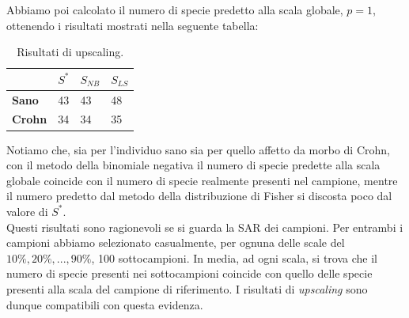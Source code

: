 Abbiamo poi calcolato il numero di specie predetto alla scala globale, $p=1$, ottenendo i risultati mostrati nella seguente tabella:

\begin{table}[H]
\centering
\begin{tabular}{l|l|l|l|}
\cline{2-4}
                                     & $S^*$ & $S_{NB}$ & $S_{LS}$ \\ \hline
\multicolumn{1}{|l|}{\textbf{Sano}}  & 43  & 43       & 48       \\ \hline
\multicolumn{1}{|l|}{\textbf{Crohn}} & 34  & 34       & 35       \\ \hline
\end{tabular}
\caption{Risultati di upscaling.}
\label{Tab:risultatiup}
\end{table}

Notiamo che, sia per l'individuo sano sia per quello affetto da morbo di Crohn, con il metodo della binomiale negativa il numero di specie predette alla scala globale coincide con il numero di specie realmente presenti nel campione, mentre il numero predetto dal metodo della distribuzione di Fisher si discosta poco dal valore di $S^*$.\\
Questi risultati sono ragionevoli se si guarda la SAR dei campioni. Per entrambi i campioni abbiamo selezionato casualmente, per ognuna delle scale del $10\%,20\%,...,90\%$, 100 sottocampioni. In media, ad ogni scala, si trova che il numero di specie presenti nei sottocampioni coincide con quello delle specie presenti alla scala del campione di riferimento. I risultati di \emph{upscaling} sono dunque compatibili con questa evidenza. 